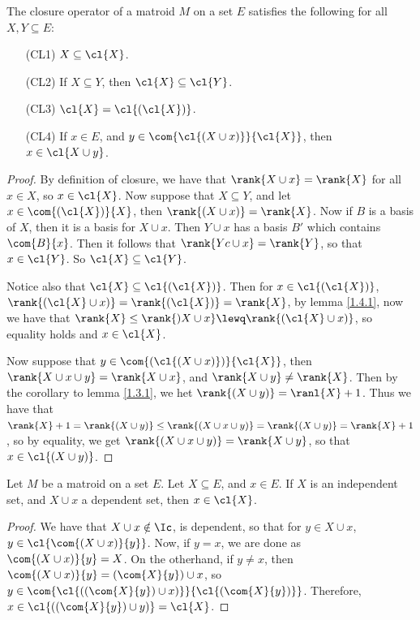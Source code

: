 \begin{lemma}\label{1.4.2}
    The closure operator of a matroid $M$ on a set  $E$ satisfies the following
    for all  $X,Y \subseteq E$:
    \begin{enumerate}
        \item[(CL1)] $X \subseteq \cl{X}$.

        \item[(CL2)] If $X \subseteq Y$, then  $\cl{X} \subseteq \cl{Y}$.

        \item[(CL3)] $\cl{X}=\cl{(\cl{X})}$.

        \item[(CL4)] If $x \in E$, and  $y \in \com{\cl{(X \cup x)}}{\cl{X}}$,
            then $x \in \cl{X \cup y}$.
    \end{enumerate}
\end{lemma}
\begin{proof}
    By definition of closure, we have that $\rank{X \cup x}=\rank{X}$ for all $x
    \in X$, so  $x \in \cl{X}$. Now suppose that $X \subseteq Y$, and let  $x
    \in \com{(\cl{X})}{X}$, then $\rank{(X \cup x)}=\rank{X}$. Now if $B$ is a
    basis of  $X$, then it is a basis for  $X \cup x$. Then  $Y \cup x$ has a
    basis  $B'$ which contains $\com{B}{x}$. Then it follows that $\rank{Yc \cup
    x}=\rank{Y}$, so that $x \in \cl{Y}$. So $\cl{X} \subseteq \cl{Y}$.

    Notice also that $\cl{X} \subseteq \cl{(\cl{X})}$. Then for $x \in
    \cl{(\cl{X})}$, $\rank{(\cl{X} \cup x)}=\rank{(\cl{X})}=\rank{X}$, by lemma
    \ref{1.4.1}, now we have that $\rank{X} \leq \rank{)X \cup x} \lewq
    \rank{(\cl{X} \cup x)}$, so equality holds and $x \in \cl{X}$.

    Now suppose that $y \in \com{{(\cl{(X \cup x)})}}{\cl{X}}$, then $\rank{X
    \cup x \cup y}=\rank{X \cup x}$, and $\rank{X \cup y} \neq \rank{X}$. Then
    by the corollary to lemma \ref{1.3.1}, we het $\rank{(X \cup
    y)}=\ranl{X}+1$. Thus we have that $\rank{X}+1=\rank{(X \cup y)} \leq
    \rank{(X \cup x \cup y)}=\rank{(X \cup y)}=\rank{X}+1$, so by equality, we
    get $\rank{(X \cup x \cup y)}=\rank{X \cup y}$, so that $x \in \cl{(X \cup
    y)}$.
\end{proof}

\begin{lemma}\label{1.4.3}
    Let $M$ be a matroid on a set $E$. Let $X \subseteq E$, and  $x \in E$. If
    $X$ is an independent set, and $X \cup x$ a dependent set, then $x \in
    \cl{X}$.
\end{lemma}
\begin{proof}
    We have that $X \cup x \notin \Ic$, is dependent, so that for  $y \in X \cup
    x$,  $y \in \cl{\com{(X \cup x)}{y}}$. Now, if $y=x$, we are done as
    $\com{(X \cup x)}{y}=X$. On the otherhand, if $y \neq x$, then  $\com{(X
    \cup x)}{y}=(\com{X}{y}) \cup x$, so $y \in \com{\cl{((\com{X}{y}) \cup
    x)}}{\cl{(\com{X}{y})}}$. Therefore, $x \in \cl{((\com{X}{y}) \cup
    y)}=\cl{X}$.
\end{proof}

